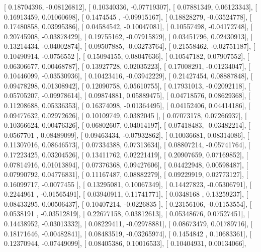 \documentclass{article}
\begin{document}
       [ 0.18704396, -0.08126812],
       [ 0.10340336, -0.07719307],
       [ 0.07881349,  0.06123343],
       [ 0.16913459,  0.01060698],
       [ 0.1474545 , -0.09915167],
       [ 0.18828279, -0.03524778],
       [ 0.17480858,  0.03995386],
       [ 0.04584542, -0.10047081],
       [ 0.10557498, -0.04172748],
       [ 0.20745908, -0.03878429],
       [ 0.19755162, -0.07915879],
       [ 0.03451796,  0.02430913],
       [ 0.13214434, -0.04002874],
       [ 0.09507885, -0.03273764],
       [ 0.21558462, -0.02751187],
       [ 0.10490914, -0.0756552 ],
       [ 0.15094155,  0.08047636],
       [ 0.10547182,  0.07907552],
       [ 0.06306677,  0.00468787],
       [ 0.13927728,  0.02035223],
       [ 0.17008291, -0.01234047],
       [ 0.10446099, -0.03530936],
       [ 0.10423416, -0.03942229],
       [ 0.21427454,  0.08887848],
       [ 0.09478298,  0.01308942],
       [ 0.12090758,  0.05610755],
       [ 0.17931013, -0.02092118],
       [ 0.05705207, -0.09978614],
       [ 0.09874881,  0.05889475],
       [ 0.04718576,  0.08629368],
       [ 0.11208688,  0.05336353],
       [ 0.16374098, -0.01364495],
       [ 0.04152406,  0.04414186],
       [ 0.09477632,  0.02972626],
       [ 0.10109749,  0.0382045 ],
       [ 0.07073178,  0.07266937],
       [ 0.10366624,  0.00476326],
       [ 0.06802607,  0.04014197],
       [ 0.07418483, -0.03482214],
       [ 0.0567701 ,  0.08489099],
       [ 0.09463434, -0.07932862],
       [ 0.10036681,  0.08314086],
       [ 0.11307016,  0.08646573],
       [ 0.07334388,  0.07313634],
       [ 0.08807214, -0.05741764],
       [ 0.17223425,  0.03204526],
       [ 0.13411762,  0.02221419],
       [ 0.20907659,  0.07169852],
       [ 0.07814916,  0.01013894],
       [ 0.07376368,  0.09427606],
       [ 0.04422948,  0.00598487],
       [ 0.07990792,  0.04776831],
       [ 0.11167487,  0.08882279],
       [ 0.09229919,  0.02773127],
       [ 0.16099717, -0.0077455 ],
       [ 0.13295081,  0.10067349],
       [ 0.14427823, -0.05306791],
       [ 0.2244961 , -0.01565491],
       [ 0.03940911,  0.11741771],
       [ 0.0348168 ,  0.13259237],
       [ 0.08433295,  0.00506437],
       [ 0.10407214, -0.0226835 ],
       [ 0.23156106, -0.01153554],
       [ 0.0538191 , -0.03512819],
       [ 0.22677158,  0.03812613],
       [ 0.05348676,  0.07527451],
       [ 0.14438952, -0.03013332],
       [ 0.08229411, -0.02978881],
       [ 0.08673479,  0.01789716],
       [ 0.18171646, -0.00482841],
       [ 0.08483519, -0.03265974],
       [ 0.1454842 ,  0.10683361],
       [ 0.12370944, -0.07449099],
       [ 0.08405386,  0.10016533],
       [ 0.10404931,  0.00134066],
\end{document}

